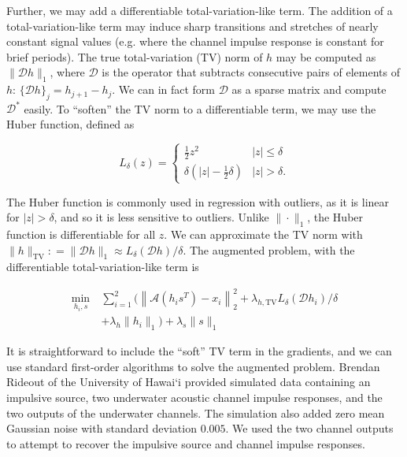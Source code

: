 \documentclass[journal]{IEEEtran}
\newcommand{\defeq}{\mathrel{\mathop:}=}
\begin{document}
\noindent Further, we may add a differentiable total-variation-like term.  The addition of a total-variation-like term may induce sharp transitions and stretches of nearly constant signal values (e.g. where the channel impulse response is constant for brief periods).  The true total-variation (TV) norm of $h$ may be computed as $\|\mathcal{D}h\|_1$, where $\mathcal{D}$ is the operator that subtracts consecutive pairs of elements of $h$: $\{\mathcal{D}h\}_j = h_{j+1} - h_j$.  We can in fact form $\mathcal{D}$ as a sparse matrix and compute $\mathcal{D}^\ast$ easily.  To ``soften'' the TV norm to a differentiable term, we may use the Huber function, defined as

\[ L_\delta(z) = \left\{\begin{array}{ll} \frac{1}{2}z^2 & |z| \le \delta\\ \delta\left(|z| - \frac{1}{2}\delta\right) & |z| > \delta. \end{array}\right. \] 

\noindent The Huber function is commonly used in regression with outliers, as it is linear for $|z|>\delta$, and so it is less sensitive to outliers.  Unlike $\|\cdot\|_1$, the Huber function is differentiable for all $z$.  We can approximate the TV norm with ${\|h\|_\text{TV} \defeq\|\mathcal{D}h\|_1 \approx L_\delta(\mathcal{D}h)/\delta}$.  The augmented problem, with the differentiable total-variation-like term is

\begin{align}
   \label{eq:bce_aug}
   \min_{h_i,s} ~&\sum_{i=1}^2\biggl(\left\|\mathcal{A}(h_is^T)-x_i\right\|_2^2 + \lambda_{h,\text{TV}}L_\delta(\mathcal{D}h_i)/\delta\nonumber\\
                 &+ \lambda_{h}\|h_i\|_1\biggr) + \lambda_s\|s\|_1
\end{align}

It is straightforward to include the ``soft'' TV term in the gradients, and we can use standard first-order algorithms to solve the augmented problem.  Brendan Rideout of the University of Hawai`i provided simulated data containing an impulsive source, two underwater acoustic channel impulse responses, and the two outputs of the underwater channels.  The simulation also added zero mean Gaussian noise with standard deviation $0.005$.  We used the two channel outputs to attempt to recover the impulsive source and channel impulse responses.\\
\end{document}
